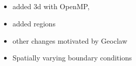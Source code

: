 %
%
%

\subsection{\amrclaw}
\begin{itemize}
    \item added 3d with OpenMP, 
    \item added regions
    \item other changes motivated by Geoclaw
    \item Spatially varying boundary conditions
\end{itemize}